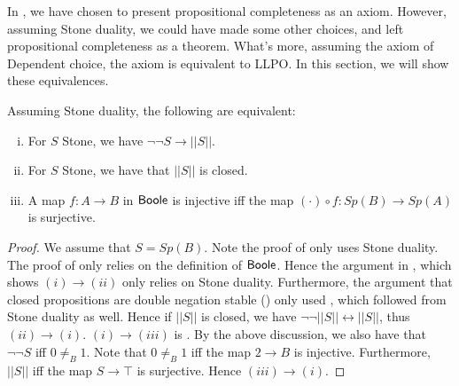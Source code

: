 In , we have chosen to present propositional completeness as an axiom. 
However, assuming Stone duality, we could have made some other choices, 
and left propositional completeness as a theorem. 
What's more, assuming the axiom of Dependent choice,
the axiom is equivalent to LLPO. 
In this section, we will show these equivalences. 

\begin{theorem}\label{AlternativesToAxiom2}
  Assuming Stone duality, the following are equivalent:
  \begin{enumerate}[(i)]
    \item For $S$ Stone, we have $\neg \neg S \to ||S||$. 
    \item For $S$ Stone, we have that $||S||$ is closed. 
    \item A map $f:A \to B$ in $\mathsf{Boole}$ is injective iff the map $(\cdot) \circ f : Sp(B) \to Sp(A)$ is surjective. 
  \end{enumerate}
\end{theorem}
\begin{proof}
  We assume that $S= Sp(B)$. 
  Note the proof of  only uses Stone duality. 
  The proof of  only relies on the definition of $\mathsf{Boole}$.
  Hence the argument in , which shows $(i)\to (ii)$ only relies on Stone duality. 
  Furthermore, the argument that closed propositions are double negation stable ()
  only used , which followed from Stone duality as well. 
  Hence if $||S||$ is closed, we have $\neg \neg ||S|| \leftrightarrow ||S||$, thus $(ii) \to (i)$. 
  $(i)\to (iii)$ is . 
  By the above discussion, we also have that $\neg \neg S$ iff $0\neq_B 1$. 
  Note that $0\neq_B 1$ iff the map $2\to B$ is injective. 
  Furthermore, $||S||$ iff the map $S \to \top $ is surjective. 
  Hence $(iii) \to (i)$. 
\end{proof} 

